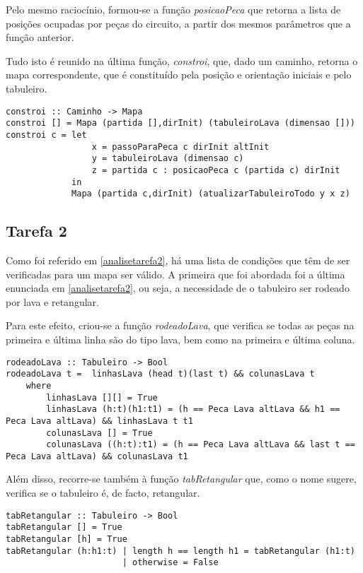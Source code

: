 \documentclass[a4paper]{report}
\begin{document}
Pelo mesmo raciocínio, formou-se a função \textit{posicaoPeca} que retorna a lista de posições ocupadas por peças do circuito, a partir dos mesmos parâmetros que a função anterior.

Tudo isto é reunido na última função, \textit{constroi}, que, dado um caminho, retorna o mapa correspondente, que é constituído pela posição e orientação iniciais e pelo tabuleiro.

\begin{verbatim}
constroi :: Caminho -> Mapa 
constroi [] = Mapa (partida [],dirInit) (tabuleiroLava (dimensao []))
constroi c = let
                 x = passoParaPeca c dirInit altInit
                 y = tabuleiroLava (dimensao c)
                 z = partida c : posicaoPeca c (partida c) dirInit
             in 
             Mapa (partida c,dirInit) (atualizarTabuleiroTodo y x z)
\end{verbatim}



\subsection{Tarefa 2}

Como foi referido em \ref{analisetarefa2}, há uma lista de condições que têm de ser verificadas para um mapa ser válido. A primeira que foi abordada foi a última enunciada em \ref{analisetarefa2}, ou seja, a necessidade de o tabuleiro ser rodeado por lava e retangular.

Para este efeito, criou-se a função \textit{rodeadoLava}, que verifica se todas as peças na primeira e última linha são do tipo lava, bem como na primeira e última coluna.

\begin{lstlisting}
rodeadoLava :: Tabuleiro -> Bool
rodeadoLava t =  linhasLava (head t)(last t) && colunasLava t 
    where
        linhasLava [][] = True
        linhasLava (h:t)(h1:t1) = (h == Peca Lava altLava && h1 == Peca Lava altLava) && linhasLava t t1 
        colunasLava [] = True
        colunasLava ((h:t):t1) = (h == Peca Lava altLava && last t == Peca Lava altLava) && colunasLava t1
\end{lstlisting}

Além disso, recorre-se também à função \textit{tabRetangular} que, como o nome sugere, verifica se o tabuleiro é, de facto, retangular.

\begin{verbatim}
tabRetangular :: Tabuleiro -> Bool
tabRetangular [] = True
tabRetangular [h] = True
tabRetangular (h:h1:t) | length h == length h1 = tabRetangular (h1:t)
                       | otherwise = False 
\end{verbatim}
\end{document}
